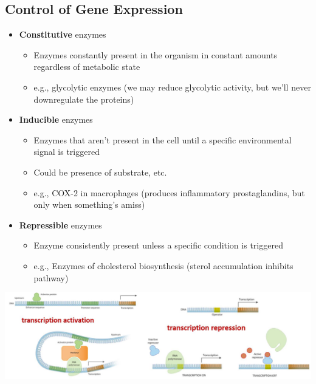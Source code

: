 \documentclass[10pt]{article}
\begin{document}
\subsection*{Control of Gene Expression}
\begin{itemize}
    \item \textbf{Constitutive} enzymes
    \begin{itemize}
        \item Enzymes constantly present in the organism in constant amounts regardless of metabolic state
        \item e.g., glycolytic enzymes (we may reduce glycolytic activity, but we'll never downregulate the proteins)
    \end{itemize}
    \item \textbf{Inducible} enzymes
    \begin{itemize}
        \item Enzymes that aren't present in the cell until a specific environmental signal is triggered
        \item Could be presence of substrate, etc.
        \item e.g., COX-2 in macrophages (produces inflammatory prostaglandins, but only when something's amiss)
    \end{itemize}
    \item \textbf{Repressible} enzymes
    \begin{itemize}
        \item Enzyme consistently present unless a specific condition is triggered
        \item e.g., Enzymes of cholesterol biosynthesis (sterol accumulation inhibits pathway)
    \end{itemize}
\end{itemize}
\begin{center}
    \includegraphics*[width=\textwidth]{L1_5.png}
\end{center}
\end{document}
